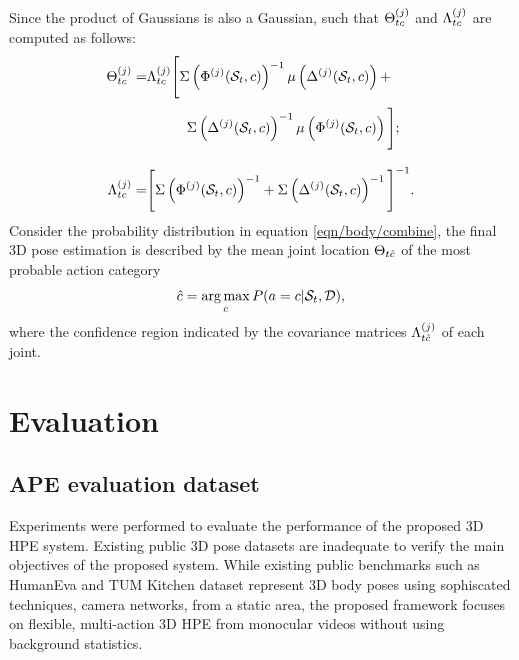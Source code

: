 Since the product of Gaussians is also a Gaussian, such that $\Theta^{(j)}_{t c}$ and $\Lambda^{(j)}_{t c}$ are computed as follows:  
\begin{equation}
	\label{eqn/body/combine2}
	\begin{split}
		\finalbodypose^{(j)}_{\timenow c} = & \finalvariance^{(j)}_{\timenow c} 
		\Bigg[
			\Sigma\left(\Phi^{(j)}(\snippetnow, c)\right)^{-1} 
			\mu\left(\toffsetfunc^{(j)}(\snippetnow, c)\right) + \\[1mm] 
			& \hspace{10mm} \Sigma\left(\toffsetfunc^{(j)}(\snippetnow, c)\right)^{-1} 
			\mu\left(\Phi^{(j)}(\snippetnow, c)\right)
		\Bigg];\\[3mm] 
		\finalvariance^{(j)}_{\timenow c} = &  
		\Bigg[
			\Sigma\left(\Phi^{(j)}(\snippetnow, c)\right)^{-1}
			+
			\Sigma\left(\toffsetfunc^{(j)}(\snippetnow, c)\right)^{-1} 
		\Bigg]^{-1}.
		\end{split}
	\end{equation}
	Consider the probability distribution in equation \ref{eqn/body/combine}, the final 3D pose estimation is described by the mean joint location $\Theta_{t\hat{c}}$ of the most probable action category 
\begin{equation} 
	\hat{c} = \operatorname*{arg\,max}_c  P(a = c | \mathcal{S}_{t}, \mathcal{D}), 
\end{equation}
where the confidence region indicated by the covariance matrices $\Lambda^{(j)}_{t\hat{c}}$ of each joint. 

\section{Evaluation}
\label{sec/body/evaluation}

\subsection{APE evaluation dataset}
Experiments were performed to evaluate the performance of the proposed 3D HPE system.
Existing public 3D pose datasets are inadequate to verify the main objectives of the proposed system.  
While existing public benchmarks such as HumanEva \cite{Sigal2010} and TUM Kitchen dataset \cite{Yao2012} represent 3D body poses using sophiscated techniques, \eg camera networks, from a static area, the proposed framework focuses on flexible, multi-action 3D HPE from monocular videos without using background statistics.

